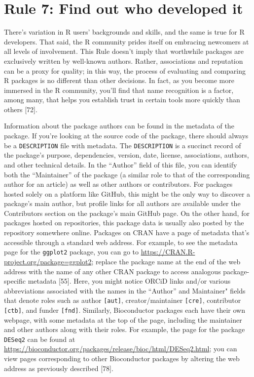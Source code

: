 \documentclass[10pt,letterpaper]{article}
\begin{document}
\hypertarget{rule-7-find-out-who-developed-it}{%
\section{Rule 7: Find out who developed
it}\label{rule-7-find-out-who-developed-it}}

There's variation in R users' backgrounds and skills, and the same is
true for R developers. That said, the R community prides itself on
embracing newcomers at all levels of involvement. This Rule doesn't
imply that worthwhile packages are exclusively written by well-known
authors. Rather, associations and reputation can be a proxy for quality;
in this way, the process of evaluating and comparing R packages is no
different than other decisions. In fact, as you become more immersed in
the R community, you'll find that name recognition is a factor, among
many, that helps you establish trust in certain tools more quickly than
others {[}72{]}.

Information about the package authors can be found in the metadata of
the package. If you're looking at the source code of the package, there
should always be a \texttt{DESCRIPTION} file with metadata. The
\texttt{DESCRIPTION} is a succinct record of the package's purpose,
dependencies, version, date, license, associations, authors, and other
technical details. In the ``Author'' field of this file, you can
identify both the ``Maintainer'' of the package (a similar role to that
of the corresponding author for an article) as well as other authors or
contributors. For packages hosted solely on a platform like GitHub, this
might be the only way to discover a package's main author, but profile
links for all authors are available under the Contributors section on
the package's main GitHub page. On the other hand, for packages hosted
on repositories, this package data is usually also posted by the
repository somewhere online. Packages on CRAN have a page of metadata
that's accessible through a standard web address. For example, to see
the metadata page for the \texttt{ggplot2} package, you can go to
\url{https://CRAN.R-project.org/package=ggplot2}; replace the package
name at the end of the web address with the name of any other CRAN
package to access analogous package-specific metadata {[}55{]}. Here,
you might notice ORCiD links and/or various abbreviations associated
with the names in the ``Author'' and Maintainer" fields that denote
roles such as author \texttt{{[}aut{]}}, creator/maintainer
\texttt{{[}cre{]}}, contributor \texttt{{[}ctb{]}}, and funder
\texttt{{[}fnd{]}}. Similarly, Bioconductor packages each have their own
webpage, with some metadata at the top of the page, including the
maintainer and other authors along with their roles. For example, the
page for the package \texttt{DESeq2} can be found at
\url{https://bioconductor.org/packages/release/bioc/html/DESeq2.html};
you can view pages corresponding to other Bioconductor packages by
altering the web address as previously described {[}78{]}.
\end{document}
